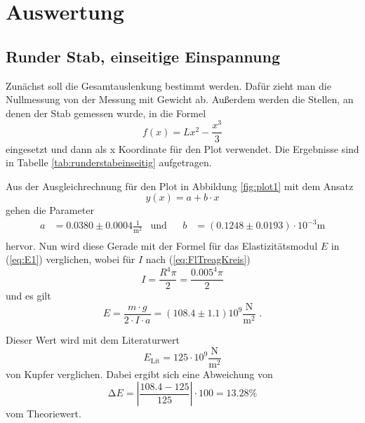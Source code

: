 \section{Auswertung}
\label{sec:Auswertung}

\subsection{Runder Stab, einseitige Einspannung}
Zunächst soll die Gesamtauslenkung bestimmt werden.
Dafür zieht man die Nullmessung von der Messung mit Gewicht ab.
Außerdem werden die Stellen, an denen der Stab gemessen wurde, in die Formel 
\begin{equation}
  f(x) = Lx^2 - \frac{x^3}{3}
\end{equation}
eingesetzt und dann als x Koordinate für den Plot verwendet.
Die Ergebnisse sind in Tabelle \ref{tab:runderstabeinseitig} aufgetragen.

Aus der Ausgleichrechnung für den Plot in Abbildung \ref{fig:plot1} mit dem Ansatz
\begin{equation*}
  y(x) = a + b \cdot x
\end{equation*}
gehen die Parameter
\begin{align*}
  a &= 0.0380 ± 0.0004 \frac{1}{\unit{\meter\squared}} & \text{und}& & b&= (0.1248 ± 0.0193) \cdot 10^{-3} \unit\meter\\
\end{align*}
hervor. Nun wird diese Gerade mit der Formel für das Elastizitätsmodul $E$ in (\ref{eq:E1}) verglichen, wobei für $I$ nach (\ref{eq:FlTreagKreis})
\begin{equation*}
  I = \frac{R^4 \pi}{2} = \frac{0.005^4 \pi}{2}
\end{equation*}
und es gilt
\begin{equation*}
  E = \frac{m \cdot g} {2 \cdot I \cdot a} = (108.4 \pm 1.1) 10^9 \frac{\unit\newton}{\unit\meter^2} \text{ .}
\end{equation*}

Dieser Wert wird mit dem Literaturwert {\cite{demtroeder1}}
\begin{equation*}
  E_\text{Lit} = 125 \cdot 10^9 \frac{\unit\newton}{\unit\meter^2}
\end{equation*}
von Kupfer verglichen. Dabei ergibt sich eine Abweichung von
\begin{equation*}
  \increment E = \left|\frac{108.4 - 125}{125}\right| \cdot 100 = 13.28 \%
\end{equation*}
vom Theoriewert.

